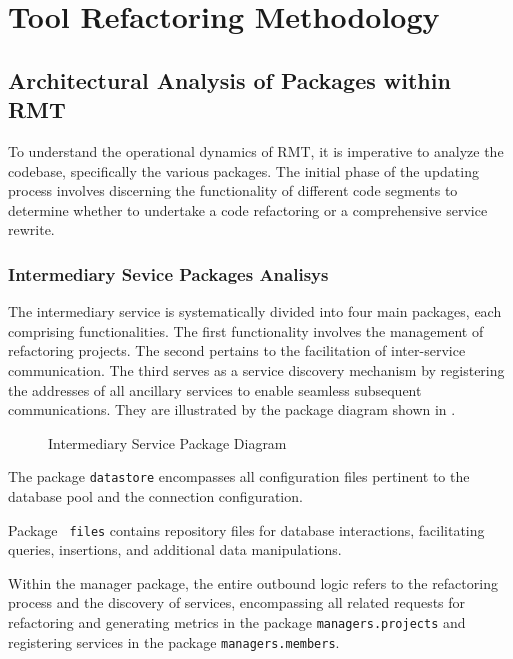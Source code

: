 \chapter{Tool Refactoring Methodology}%
\label{methodology}

\section{Architectural Analysis of Packages within RMT}

To understand the operational dynamics of RMT, it is imperative to analyze the codebase, specifically the various packages. The initial phase of the updating process involves discerning the functionality of different code segments to determine whether to undertake a code refactoring or a comprehensive service rewrite.

\subsection{Intermediary Sevice Packages Analisys}
\label{sub-intermediary-packages}
The intermediary service is systematically divided into four main packages, each comprising functionalities. The first functionality involves the management of refactoring projects. The second pertains to the facilitation of inter-service communication. The third serves as a service discovery mechanism by registering the addresses of all ancillary services to enable seamless subsequent communications. They are illustrated by the package diagram shown in .

\begin{figure}[ht!]
\SetCaptionWidth{\textwidth}
\caption{Intermediary Service Package Diagram}
\label{fig-package-intermediary}

\end{figure}
\FloatBarrier

The package \texttt{datastore} encompasses all configuration files pertinent to the database pool and the connection configuration.

Package \texttt{ files} contains repository files for database interactions, facilitating queries, insertions, and additional data manipulations.

Within the manager package, the entire outbound logic refers to the refactoring process and the discovery of services, encompassing all related requests for refactoring and generating metrics in the package \texttt{managers.projects} and registering services in the package \texttt{managers.members}.

